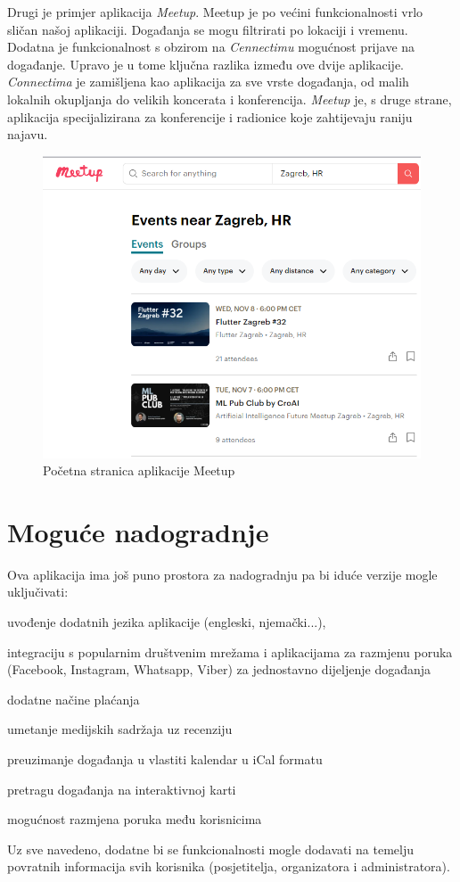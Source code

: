 		Drugi je primjer aplikacija \textit{Meetup}. Meetup je po većini funkcionalnosti vrlo sličan našoj aplikaciji. Događanja se mogu filtrirati po lokaciji i vremenu. Dodatna je funkcionalnost s obzirom na \textit{Cennectimu} mogućnost prijave na događanje. Upravo je u tome ključna razlika između ove dvije aplikacije. \textit{Connectima} je zamišljena kao aplikacija za sve vrste događanja, od malih lokalnih okupljanja do velikih koncerata i konferencija. \textit{Meetup} je, s druge strane, aplikacija specijalizirana za konferencije i radionice koje zahtijevaju raniju najavu.\\
	
		 
		\begin{figure}[H]
			\includegraphics[scale=0.9]{slike/Meetup.png}
			\centering
			\caption{Početna stranica aplikacije Meetup}
		\end{figure}
		
		\newpage
		
		\section{Moguće nadogradnje}
		
		Ova aplikacija ima još puno prostora za nadogradnju pa bi iduće verzije mogle uključivati:
			
			\begin{packed_enum}
				\item uvođenje dodatnih jezika aplikacije (engleski, njemački...),
				\item integraciju s popularnim društvenim mrežama i aplikacijama za razmjenu poruka (Facebook, Instagram, Whatsapp, Viber) za jednostavno dijeljenje događanja
				\item dodatne načine plaćanja
				\item umetanje medijskih sadržaja uz recenziju
				\item preuzimanje događanja u vlastiti kalendar u iCal formatu
				\item pretragu događanja na interaktivnoj karti
				\item mogućnost razmjena poruka među korisnicima
			\end{packed_enum}
			
		Uz sve navedeno, dodatne bi se funkcionalnosti mogle dodavati na temelju povratnih informacija svih korisnika (posjetitelja, organizatora i administratora).
		
		\eject
		
	
